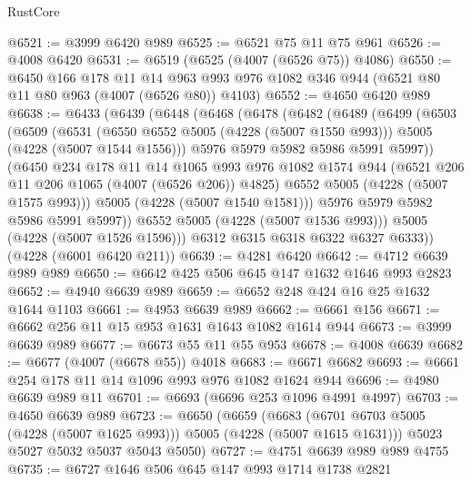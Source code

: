 \begin{lexlean}{RustCore}
\begin{coremodule}
@6521 := @3999 @6420 @989
@6525 := @6521 @75 @11 @75 @961
@6526 := @4008 @6420
@6531 := @6519 (@6525 (@4007 (@6526 @75)) @4086)
@6550 := @6450
    @166
    @178
    @11
    @14
    @963
    @993
    @976
    @1082
    @346
    @944
    (@6521 @80 @11 @80 @963 (@4007 (@6526 @80)) @4103)
@6552 := @4650 @6420 @989
@6638 := @6433
    (@6439
      (@6448
        (@6468
          (@6478
            (@6482
              (@6489
                (@6499
                  (@6503
                    (@6509
                      (@6531
                        (@6550 @6552 @5005 (@4228 (@5007 @1550 @993)))
                        @5005
                        (@4228 (@5007 @1544 @1556)))
                      @5976
                      @5979
                      @5982
                      @5986
                      @5991
                      @5997))
                  (@6450
                    @234
                    @178
                    @11
                    @14
                    @1065
                    @993
                    @976
                    @1082
                    @1574
                    @944
                    (@6521 @206 @11 @206 @1065 (@4007 (@6526 @206)) @4825)
                    @6552
                    @5005
                    (@4228 (@5007 @1575 @993)))
                  @5005
                  (@4228 (@5007 @1540 @1581)))
                @5976
                @5979
                @5982
                @5986
                @5991
                @5997))
            @6552
            @5005
            (@4228 (@5007 @1536 @993)))
          @5005
          (@4228 (@5007 @1526 @1596)))
        @6312
        @6315
        @6318
        @6322
        @6327
        @6333))
    (@4228 (@6001 @6420 @211))
@6639 := @4281 @6420
@6642 := @4712 @6639 @989 @989
@6650 := @6642 @425 @506 @645 @147 @1632 @1646 @993 @2823
@6652 := @4940 @6639 @989
@6659 := @6652 @248 @424 @16 @25 @1632 @1644 @1103
@6661 := @4953 @6639 @989
@6662 := @6661 @156
@6671 := @6662 @256 @11 @15 @953 @1631 @1643 @1082 @1614 @944
@6673 := @3999 @6639 @989
@6677 := @6673 @55 @11 @55 @953
@6678 := @4008 @6639
@6682 := @6677 (@4007 (@6678 @55)) @4018
@6683 := @6671 @6682
@6693 := @6661 @254 @178 @11 @14 @1096 @993 @976 @1082 @1624 @944
@6696 := @4980 @6639 @989 @11
@6701 := @6693 (@6696 @253 @1096 @4991 @4997)
@6703 := @4650 @6639 @989
@6723 := @6650
    (@6659
      (@6683 (@6701 @6703 @5005 (@4228 (@5007 @1625 @993))) @5005 (@4228 (@5007 @1615 @1631)))
      @5023
      @5027
      @5032
      @5037
      @5043
      @5050)
@6727 := @4751 @6639 @989 @989 @4755
@6735 := @6727 @1646 @506 @645 @147 @993 @1714 @1738 @2821

\end{coremodule}
\end{lexlean}
